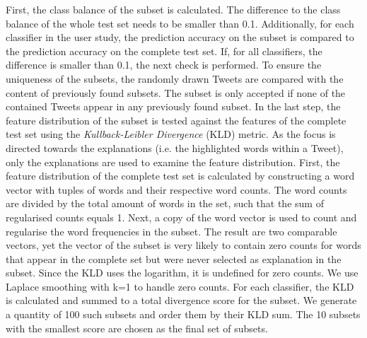 First, the class balance of the subset is calculated. The difference to the class balance of the whole test set needs to be smaller than 0.1.\newline
Additionally, for each classifier in the user study, the prediction accuracy on the subset is compared to the prediction accuracy on the complete test set. If, for all classifiers, the difference is smaller than 0.1, the next check is performed.\newline
To ensure the uniqueness of the subsets, the randomly drawn Tweets are compared with the content of previously found subsets. The subset is only accepted if none of the contained Tweets appear in any previously found subset.\newline
In the last step, the feature distribution of the subset is tested against the features of the complete test set using the \textit{Kullback-Leibler Divergence} (KLD) metric. As the focus is directed towards the explanations (i.e. the highlighted words within a Tweet), only the explanations are used to examine the feature distribution. First, the feature distribution of the complete test set is calculated by constructing a word vector with tuples of words and their respective word counts. The word counts are divided by the total amount of words in the set, such that the sum of regularised counts equals 1. Next, a copy of the word vector is used to count and regularise the word frequencies in the subset. The result are two comparable vectors, yet the vector of the subset is very likely to contain zero counts for words that appear in the complete set but were never selected as explanation in the subset. Since the KLD uses the logarithm, it is undefined for zero counts. We use Laplace smoothing with k=1 to handle zero counts. For each classifier, the KLD is calculated and summed to a total divergence score for the subset.\newline
We generate a quantity of 100 such subsets and order them by their KLD sum. The 10 subsets with the smallest score are chosen as the final set of subsets.\newline



